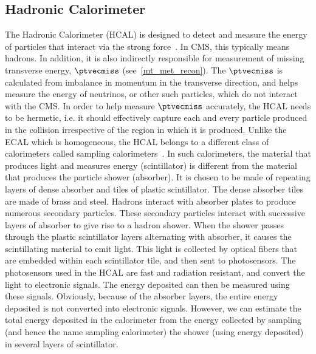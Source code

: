 \subsection{Hadronic Calorimeter}
\label{Hcal}
The Hadronic Calorimeter (HCAL) is designed to detect and measure the energy of particles that interact via the strong force~\cite{cms_exp_ref}. In CMS, this typically means hadrons. In addition, it is also indirectly responsible for measurement of missing transverse energy, $\ptvecmiss$ (see~\ref{mt_met_recon}). The $\ptvecmiss$ is calculated from imbalance in momentum in the transverse direction, and helps measure the energy of neutrinos, or other such particles, which do not interact with the CMS. In order to help measure $\ptvecmiss$ accurately, the HCAL needs to be hermetic, i.e. it should effectively capture each and every particle produced in the collision irrespective of the region in which it is produced. Unlike the ECAL which is homogeneous, the HCAL belongs to a different class of calorimeters called sampling calorimeters~\cite{hcal1}. In such calorimeters, the  material that produces light and measures energy (scintillator) is different from the material that produces the particle shower (absorber). It is chosen to be made of repeating layers of dense absorber and tiles of plastic scintillator. The dense absorber tiles are made of brass and steel. Hadrons interact with absorber plates to produce numerous secondary particles. These secondary particles interact with successive layers of absorber to give rise to a hadron shower. When the shower passes through the plastic scintillator layers alternating with absorber, it causes the scintillating material to emit light. This light is collected by optical fibers that are embedded within each scintillator tile, and then sent to photosensors. The photosensors used in the HCAL are fast and radiation resistant, and convert the light to electronic signals. The energy deposited can then be measured using these signals. Obviously, because of the absorber layers, the entire energy deposited is not converted into electronic signals. However, we can estimate the total energy deposited in the calorimeter from the energy collected by sampling (and hence the name sampling calorimeter) the shower (using  energy deposited) in several layers of scintillator.



